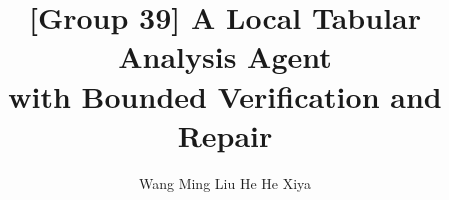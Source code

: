 \documentclass{article}
\title{[Group 39] A Local Tabular Analysis Agent\\with Bounded Verification and Repair}
\author{Wang Ming \And Liu He \And He Xiya}
\begin{document}
\maketitle
\begin{abstract}

\end{abstract}

\clearpage

\end{document}
